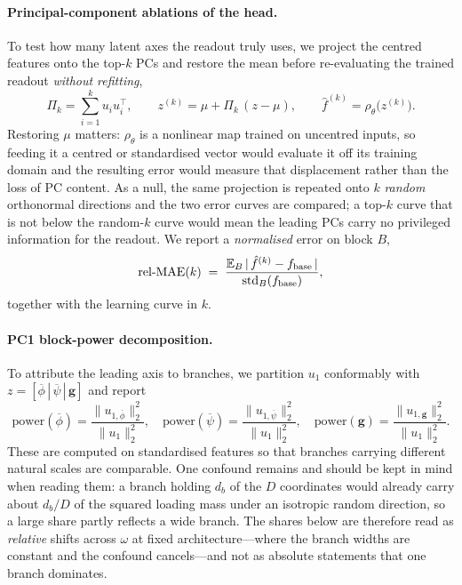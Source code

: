 \paragraph{Principal-component ablations of the head.}
\label{subsec:repr-pc-ablate}
To test how many latent axes the readout truly uses, we project the centred features onto
the top-$k$ PCs and restore the mean before re-evaluating the trained readout \emph{without
refitting},
\begin{equation}
\Pi_k=\sum_{i=1}^k u_i u_i^\top,
\qquad
z^{(k)}=\mu+\Pi_k\,(z-\mu),
\qquad
\hat f^{(k)}=\rho_\theta\big(z^{(k)}\big).
\label{eq:pc-ablation}
\end{equation}
Restoring $\mu$ matters: $\rho_\theta$ is a nonlinear map trained on uncentred inputs, so
feeding it a centred or standardised vector would evaluate it off its training domain and
the resulting error would measure that displacement rather than the loss of PC content. As a
null, the same projection is repeated onto $k$ \emph{random} orthonormal directions and the
two error curves are compared; a top-$k$ curve that is not below the random-$k$ curve would
mean the leading PCs carry no privileged information for the readout.
We report a \emph{normalised} error on block $B$,
\[
\mathrm{rel\text{-}MAE}(k)\;=\;
\frac{\mathbb{E}_B\,|\,\hat f^{(k)}-f_{\rm base}\,|}
     {\mathrm{std}_B(f_{\rm base})},
\]
together with the learning curve in $k$.

\paragraph{PC1 block-power decomposition.}
\label{subsec:repr-pc1-power}
To attribute the leading axis to branches, we partition $u_1$ conformably with
$z=[\overline{\phi}\,|\,\overline{\psi}\,|\,\mathbf{g}]$ and report
\[
\text{power}(\overline{\phi})=\frac{\|u_{1,\overline{\phi}}\|_2^2}{\|u_1\|_2^2},
\quad
\text{power}(\overline{\psi})=\frac{\|u_{1,\overline{\psi}}\|_2^2}{\|u_1\|_2^2},
\quad
\text{power}(\mathbf{g})=\frac{\|u_{1,\mathbf{g}}\|_2^2}{\|u_1\|_2^2}.
\]
These are computed on standardised features so that branches carrying different natural
scales are comparable. One confound remains and should be kept in mind when reading them: a
branch holding $d_b$ of the $D$ coordinates would already carry about $d_b/D$ of the squared
loading mass under an isotropic random direction, so a large share partly reflects a wide
branch. The shares below are therefore read as \emph{relative} shifts across $\omega$ at
fixed architecture---where the branch widths are constant and the confound cancels---and not
as absolute statements that one branch dominates.

